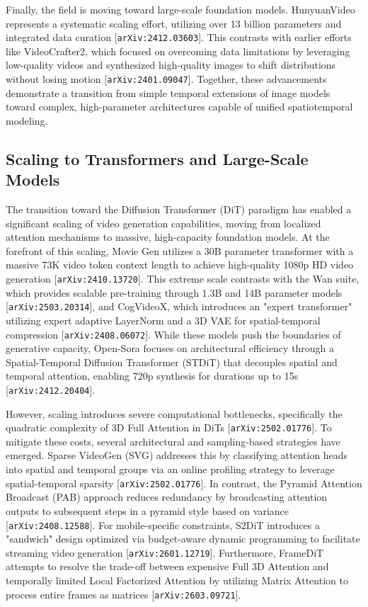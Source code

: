 \documentclass[11pt]{article}
\begin{document}
Finally, the field is moving toward large-scale foundation models. HunyuanVideo represents a systematic scaling effort, utilizing over 13 billion parameters and integrated data curation [\texttt{arXiv:2412.03603}]. This contrasts with earlier efforts like VideoCrafter2, which focused on overcoming data limitations by leveraging low-quality videos and synthesized high-quality images to shift distributions without losing motion [\texttt{arXiv:2401.09047}]. Together, these advancements demonstrate a transition from simple temporal extensions of image models toward complex, high-parameter architectures capable of unified spatiotemporal modeling.

\subsection{Scaling to Transformers and Large-Scale Models}

The transition toward the Diffusion Transformer (DiT) paradigm has enabled a significant scaling of video generation capabilities, moving from localized attention mechanisms to massive, high-capacity foundation models. At the forefront of this scaling, Movie Gen utilizes a 30B parameter transformer with a massive 73K video token context length to achieve high-quality 1080p HD video generation [\texttt{arXiv:2410.13720}]. This extreme scale contrasts with the Wan suite, which provides scalable pre-training through 1.3B and 14B parameter models [\texttt{arXiv:2503.20314}], and CogVideoX, which introduces an "expert transformer" utilizing expert adaptive LayerNorm and a 3D VAE for spatial-temporal compression [\texttt{arXiv:2408.06072}]. While these models push the boundaries of generative capacity, Open-Sora focuses on architectural efficiency through a Spatial-Temporal Diffusion Transformer (STDiT) that decouples spatial and temporal attention, enabling 720p synthesis for durations up to 15s [\texttt{arXiv:2412.20404}].

However, scaling introduces severe computational bottlenecks, specifically the quadratic complexity of 3D Full Attention in DiTs [\texttt{arXiv:2502.01776}]. To mitigate these costs, several architectural and sampling-based strategies have emerged. Sparse VideoGen (SVG) addresses this by classifying attention heads into spatial and temporal groups via an online profiling strategy to leverage spatial-temporal sparsity [\texttt{arXiv:2502.01776}]. In contrast, the Pyramid Attention Broadcast (PAB) approach reduces redundancy by broadcasting attention outputs to subsequent steps in a pyramid style based on variance [\texttt{arXiv:2408.12588}]. For mobile-specific constraints, S2DiT introduces a "sandwich" design optimized via budget-aware dynamic programming to facilitate streaming video generation [\texttt{arXiv:2601.12719}]. Furthermore, FrameDiT attempts to resolve the trade-off between expensive Full 3D Attention and temporally limited Local Factorized Attention by utilizing Matrix Attention to process entire frames as matrices [\texttt{arXiv:2603.09721}].
\end{document}
